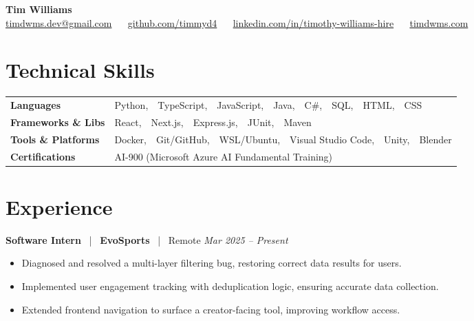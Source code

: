 \documentclass[10pt, letterpaper]{article}
\newcommand{\jobhead}[4]{%
  \vspace{5pt}%
  {\bfseries\color{dark}#1}%
  ~{\color{light}|}~%
  {\bfseries\color{navy}#2}%
  ~{\color{light}|}~%
  {\color{light}#3}%
  \hfill{\color{light}\small\textit{#4}}\\[-2pt]%
}
\newcommand{\skillrow}[2]{%
  {\bfseries #1} & #2 \\[2pt]%
}
\begin{document}

\begin{center}
  {\huge\bfseries\color{navy} Tim Williams}\\[4pt]
  {\small\color{light}
    \href{mailto:timdwms.dev@gmail.com}{timdwms.dev@gmail.com}
    ~\textbullet~
    \href{https://github.com/timmyd4}{github.com/timmyd4}
    ~\textbullet~
    \href{https://www.linkedin.com/in/timothy-williams-hire}{linkedin.com/in/timothy-williams-hire}
    ~\textbullet~
    \href{https://timdwms.com}{timdwms.com}
  }
\end{center}

\vspace{2pt}

\section{Technical Skills}

\begin{tabular}{@{}p{1.6in} p{5.2in}@{}}
  \skillrow{Languages}{Python,\ \ TypeScript,\ \ JavaScript,\ \ Java,\ \ C\#,\ \ SQL,\ \ HTML,\ \ CSS}
  \skillrow{Frameworks \& Libs}{React,\ \ Next.js,\ \ Express.js,\ \ JUnit,\ \ Maven}
  \skillrow{Tools \& Platforms}{Docker,\ \ Git/GitHub,\ \ WSL/Ubuntu,\ \ Visual Studio Code,\ \ Unity,\ \ Blender}
  \skillrow{Certifications}{AI-900 (Microsoft Azure AI Fundamental Training)}
\end{tabular}

\section{Experience}

\jobhead{Software Intern}{EvoSports}{Remote}{Mar 2025 – Present}
\begin{itemize}
  \item Diagnosed and resolved a multi-layer filtering bug, restoring correct data results for users.
  \item Implemented user engagement tracking with deduplication logic, ensuring accurate data collection.
  \item Extended frontend navigation to surface a creator-facing tool, improving workflow access.
\end{itemize}
\end{document}
